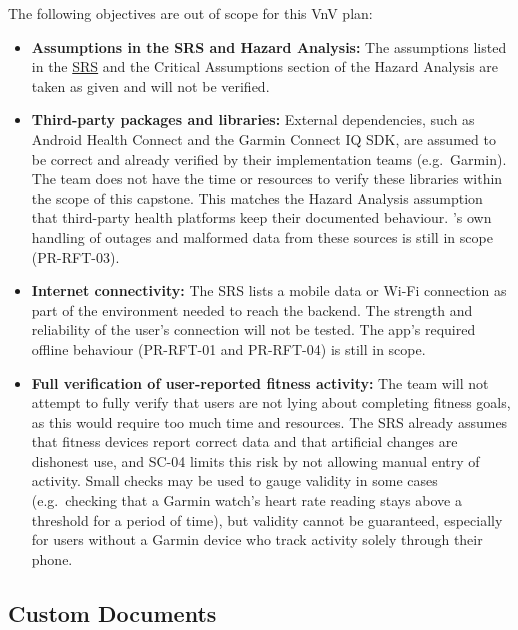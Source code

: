 \documentclass[12pt, titlepage]{article}
\begin{document}
The following objectives are out of scope for this VnV plan:
\begin{itemize}
  \item \textbf{Assumptions in the SRS and Hazard Analysis:} The assumptions listed in the \href{https://github.com/arjunkarthik123/fitness-finance-application/blob/main/pdfs/SRS-Volere/SRS.pdf}{SRS} and the Critical Assumptions section of the Hazard Analysis are taken as given and will not be verified.
  \item \textbf{Third-party packages and libraries:} External dependencies, such as Android Health Connect and the Garmin Connect IQ SDK, are assumed to be correct and already verified by their implementation teams (e.g.\ Garmin). The team does not have the time or resources to verify these libraries within the scope of this capstone. This matches the Hazard Analysis assumption that third-party health platforms keep their documented behaviour. \progname{}'s own handling of outages and malformed data from these sources is still in scope (PR-RFT-03).
  \item \textbf{Internet connectivity:} The SRS lists a mobile data or Wi-Fi connection as part of the environment needed to reach the \progname{} backend. The strength and reliability of the user's connection will not be tested. The app's required offline behaviour (PR-RFT-01 and PR-RFT-04) is still in scope.
  \item \textbf{Full verification of user-reported fitness activity:} The team will not attempt to fully verify that users are not lying about completing fitness goals, as this would require too much time and resources. The SRS already assumes that fitness devices report correct data and that artificial changes are dishonest use, and SC-04 limits this risk by not allowing manual entry of activity. Small checks may be used to gauge validity in some cases (e.g.\ checking that a Garmin watch's heart rate reading stays above a threshold for a period of time), but validity cannot be guaranteed, especially for users without a Garmin device who track activity solely through their phone.
\end{itemize}

\subsection{Custom Documents}
\end{document}
